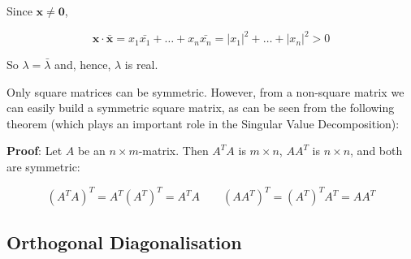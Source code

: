 \begin{paracol}{2}
Since $\mathbf{x} \neq \mathbf{0}$,

$$\mathbf{x} \cdot \bar{\mathbf{x}} = x_1 \bar{x_1} + \dots + x_n \bar{x_n} = |x_1|^2 + \dots + |x_n|^2 > 0$$

So $\lambda = \bar{\lambda}$ and, hence, $\lambda$ is real. \\

\end{paracol}

Only square matrices can be symmetric. However, from a non-square matrix we can easily build a symmetric square matrix, as can be seen from the following  theorem (which plays an important role in the Singular Value Decomposition):

\begin{paracol}{2}


\switchcolumn

\textbf{Proof}: Let $A$ be an $n \times m$-matrix. Then $A^TA$ is $m \times n$, $AA^T$ is $n \times n$, and both are symmetric:

\vspace{-15pt}

$$(A^T A)^T = A^T (A^T)^T = A^T A \qquad (AA^T)^T = (A^T)^T A^T = AA^T$$

\end{paracol}

\subsection{Orthogonal Diagonalisation}


